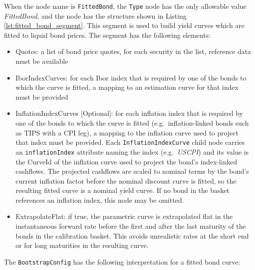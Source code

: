 When the node name is \lstinline!FittedBond!, the \lstinline!Type! node has the only allowable value \emph{FittedBond},
and the node has the structure shown in Listing \ref{lst:fitted_bond_segment}. This segment is used to build yield
curves which are fitted to liquid bond prices. The segment has the following elements:

\begin{itemize}
\item Quotes: a list of bond price quotes, for each security in the list, reference data must be available
\item IborIndexCurves: for each Ibor index that is required by one of the bonds to which the curve is fitted, a mapping
  to an estimation curve for that index must be provided
\item InflationIndexCurves [Optional]: for each inflation index that is required by one of the bonds to which the curve
  is fitted (e.g.\ inflation-linked bonds such as TIPS with a CPI leg), a mapping to the inflation curve used to project
  that index must be provided. Each \lstinline!InflationIndexCurve! child node carries an \lstinline!inflationIndex!
  attribute naming the index (e.g.\ \emph{USCPI}) and its value is the CurveId of the inflation curve used to project
  the bond's index-linked cashflows. The projected cashflows are scaled to nominal terms by the bond's current inflation
  factor before the nominal discount curve is fitted, so the resulting fitted curve is a nominal yield curve. If no bond
  in the basket references an inflation index, this node may be omitted.
\item ExtrapolateFlat: if true, the parametric curve is extrapolated flat in the instantaneous forward rate before the
  first and after the last maturity of the bonds in the calibration basket. This avoids unrealistic rates at the short
  end or for long maturities in the resulting curve.
\end{itemize}

The \lstinline!BootstrapConfig! has the following interpretation for a fitted bond curve:

